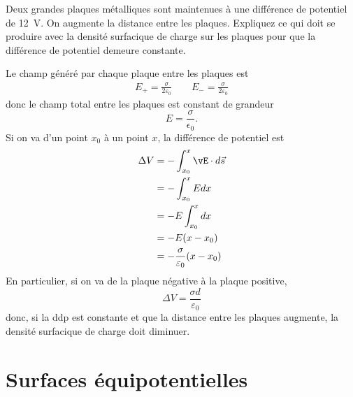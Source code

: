 \begin{diapobox}

Deux grandes plaques métalliques sont maintenues à une différence de potentiel
de \SI{12}{V}. On augmente la distance entre les plaques. Expliquez ce qui doit
se produire avec la densité surfacique de charge sur les plaques pour que la
différence de potentiel demeure constante.
\end{diapobox}

\begin{reponsebox}
\begin{center}
\end{center}

Le champ généré par chaque plaque entre les plaques est
\begin{align*}
  E_{+} = \frac{\sigma}{2 \varepsilon_0} \quad\quad E_{-} = \frac{\sigma}{2 \varepsilon_0}
\end{align*}
donc le champ total entre les plaques est constant de grandeur
\[
  E = \frac{\sigma}{\epsilon_0}.
\]
Si on va d'un point $x_0$ à un point $x$, la différence de potentiel est
\begin{align*}
  \Delta V &= - \int_{x_0}^x \vE \cdot d\vec{s}  \\
           &= - \int_{x_0}^x E dx  \\
           &= - E\int_{x_0}^x dx  \\
           &= - E (x - x_0) \\
           &= - \frac{\sigma}{\varepsilon_0} (x - x_0) \\
\end{align*}
En particulier, si on va de la plaque négative à la plaque positive,
\[\Delta V = \frac{\sigma d}{\varepsilon_0} \]
donc, si la ddp est constante et que la distance entre les plaques augmente,
la densité surfacique de charge doit diminuer.
\end{reponsebox}

\clearpage



\section{Surfaces équipotentielles}

